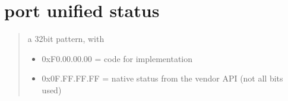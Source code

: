 \documentclass[a4paper,10pt,english]{sphinxmanual}
\begin{document}
\section{port unified status}
\label{\detokenize{canports:port-unified-status}}\begin{quote}

a 32\sphinxhyphen{}bit pattern, with
\begin{itemize}
\item {} 
0xF0.00.00.00 = code for implementation

\item {} 
0x0F.FF.FF.FF = native status from the vendor API (not all bits used)

\end{itemize}
\end{quote}
\end{document}
